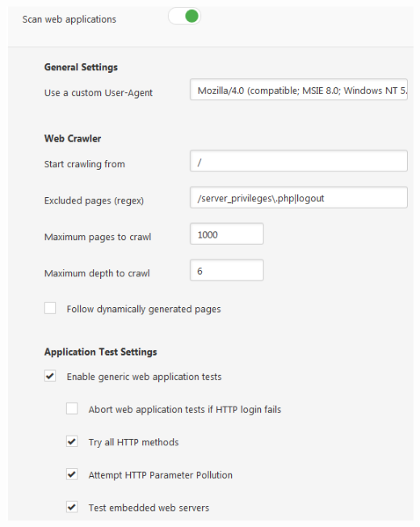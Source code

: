 \documentclass[11pt, a4paper]{article}
\begin{document}
$\;$ \\ \\
\noindent\begin{minipage}{\textwidth}
    \centering
    \includegraphics[width=\textwidth]{Nessus_9.png}
\end{minipage}
$\;$ \\ \\
\end{document}
